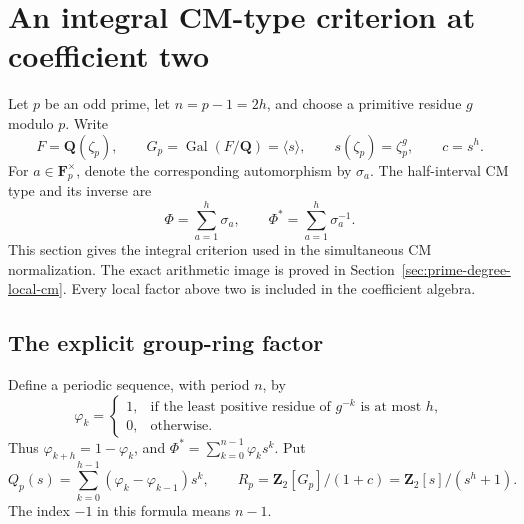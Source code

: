 \section{An integral CM-type criterion at coefficient two}
\label{sec:cm-type-unit-criterion}

Let \(p\) be an odd prime, let \(n=p-1=2h\), and choose a
primitive residue \(g\) modulo \(p\). Write
\[
 F=\mathbf Q(\zeta_p),\qquad
 G_p=\operatorname{Gal}(F/\mathbf Q)=\langle s\rangle,
 \qquad s(\zeta_p)=\zeta_p^g,\qquad c=s^h.
\]
For \(a\in\mathbf F_p^\times\), denote the corresponding automorphism
by \(\sigma_a\). The half-interval CM type and its inverse are
\begin{equation}
 \Phi=\sum_{a=1}^{h}\sigma_a,
 \qquad \Phi^*=\sum_{a=1}^{h}\sigma_a^{-1}.
                                                        \label{eq:cm-type-1}
\end{equation}
This section gives the integral criterion used in the simultaneous CM
normalization. The exact arithmetic image is proved in
Section~\ref{sec:prime-degree-local-cm}. Every local factor above two
is included in the coefficient algebra.

\subsection{The explicit group-ring factor}

Define a periodic sequence, with period \(n\), by
\[
 \varphi_k=
 \begin{cases}
 1,&\text{if the least positive residue of }g^{-k}\text{ is at most }h,\\
 0,&\text{otherwise}.
 \end{cases}
\]
Thus \(\varphi_{k+h}=1-\varphi_k\), and
\(\Phi^*=\sum_{k=0}^{n-1}\varphi_k s^k\). Put
\begin{equation}
 Q_p(s)=\sum_{k=0}^{h-1}(\varphi_k-\varphi_{k-1})s^k,
 \qquad
 R_p=\mathbf Z_2[G_p]/(1+c)
       =\mathbf Z_2[s]/(s^h+1).
                                                        \label{eq:cm-type-2}
\end{equation}
The index \(-1\) in this formula means \(n-1\).

